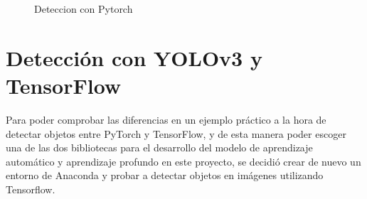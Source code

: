   \begin{figure}[H]
    \begin{center}
      \subcapcentertrue
      \hspace{2mm}
    \end{center}
    \caption{Deteccion con Pytorch}
    \label{fig:Deteccion_Pytorch}
  \end{figure}

\section{Detección con YOLOv3 y TensorFlow}
\label{exp_seleccion_algoritmo}

Para poder comprobar las diferencias en un ejemplo práctico a la hora de detectar objetos entre PyTorch y TensorFlow, y de esta manera poder escoger una de las dos bibliotecas para el desarrollo del modelo de aprendizaje automático y aprendizaje profundo en este proyecto, se decidió crear de nuevo un entorno de Anaconda y probar a detectar objetos en imágenes utilizando Tensorflow.\\

